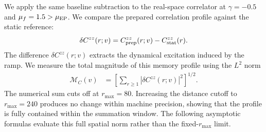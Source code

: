 \documentclass[aps,prb,reprint,superscriptaddress,amsmath,amssymb,floatfix]{revtex4-2}
\begin{document}
  We apply the same baseline subtraction to the real-space correlator at $\gamma=-0.5$ and $\mu_f=1.5>\mu_{\rm EP}$. We compare the prepared correlation profile against the static reference:
\begin{equation}
\delta C^{zz}(r;v) = C_{\rm prep}^{zz}(r;v) - C_{\rm stat}^{zz}(r).
\label{eq:czz_memory_profile}
\end{equation}
The difference $\delta C^{zz}(r;v)$ extracts the dynamical excitation induced by the ramp. We measure the total magnitude of this memory profile using the $L^2$ norm
\begin{equation}
\begin{aligned}
\mathcal M_C(v) &= \left[ \sum_{r\ge 1} \left| \delta C^{zz}(r;v) \right|^2 \right]^{1/2}.
\end{aligned} \label{eq:czz_memory_measure}
\end{equation}
The numerical sum cuts off at $r_{\max}=80$. Increasing the distance cutoff to $r_{\max}=240$ produces no change within machine precision, showing that the profile is fully contained within the summation window. The following asymptotic formulas evaluate this full spatial norm rather than the fixed-$r_{\max}$ limit.
\end{document}
